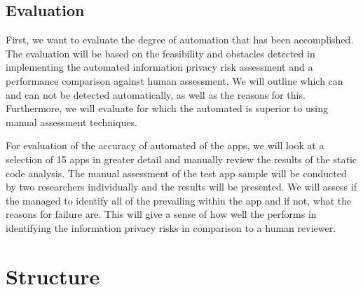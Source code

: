 \documentclass[
	a4paper,
	oneside,
	12pt,
	liststotocnumbered
]{article}
\begin{document}
\subsection{Evaluation}

First, we want to evaluate the degree of \pra automation that has been accomplished. 
The evaluation will be based on the feasibility and obstacles detected in implementing the automated information privacy risk assessment and a performance comparison against human assessment.
We will outline which \iprfs can and can not be detected automatically, as well as the reasons for this.
Furthermore, we will evaluate for which \prfs the automated \sca is superior to using manual assessment techniques.

For evaluation of the accuracy of automated \sca of the apps, we will look at a selection of 15 apps in greater detail and manually review the results of the static code analysis.
The manual assessment of the test app sample will be conducted by two researchers individually and the results will be presented.
We will assess if the \sca managed to identify all of the prevailing \ipr within the app and if not, what the reasons for failure are.
This will give a sense of how well the \sca performs in identifying the information privacy risks in comparison to a human reviewer.

\section{Structure}
\end{document}
